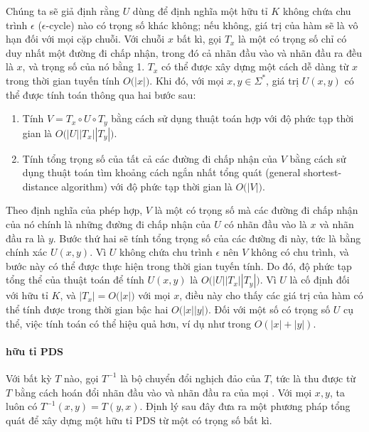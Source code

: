 Chúng ta sẽ giả định rằng  $U$ dùng để định nghĩa một
 hữu tỉ $K$ không chứa chu trình $\epsilon$ ($\epsilon$-cycle) nào
có trọng số khác không; nếu không, giá trị của hàm  sẽ là vô hạn đối
với mọi cặp chuỗi. Với chuỗi $x$ bất kì, gọi $T_x$ là một  có
trọng số chỉ có duy nhất một đường đi chấp nhận, trong đó cả nhãn đầu vào và
nhãn đầu ra đều là $x$, và trọng số của nó bằng 1. $T_x$ có thể được xây dựng
một cách dễ dàng từ $x$ trong thời gian tuyến tính $O\bigl( |x| \bigr)$. Khi
đó, với mọi $x, y \in \Sigma^*$, giá trị $U(x, y)$ có thể được tính toán thông
qua hai bước sau: \begin{enumerate}
  \item Tính $V = T_x \circ U \circ T_y$ bằng cách sử dụng thuật toán hợp với
    độ phức tạp thời gian là $O\bigl(|U||T_x||T_y|\bigr)$.
  \item Tính tổng trọng số của tất cả các đường đi chấp nhận của $V$ bằng cách
    sử dụng thuật toán tìm khoảng cách ngắn nhất tổng quát (general
    shortest-distance algorithm) với độ phức tạp thời gian là $O\bigl( |V|
    \bigr)$.
\end{enumerate}
Theo định nghĩa của phép hợp, $V$ là một  có trọng số mà các
đường đi chấp nhận của nó chính là những đường đi chấp nhận của $U$ có nhãn đầu
vào là $x$ và nhãn đầu ra là $y$. Bước thứ hai sẽ tính tổng trọng số của các
đường đi này, tức là bằng chính xác $U(x, y)$. Vì $U$ không chứa chu trình
$\epsilon$ nên $V$ không có chu trình, và bước này có thể được thực hiện trong
thời gian tuyến tính. Do đó, độ phức tạp tổng thể của thuật toán để tính $U(x,
y)$ là $O\bigl(|U||T_x||T_y|\bigr)$. Vì $U$ là cố định đối với  hữu
tỉ $K$, và $|T_x| = O\bigl(|x|\bigr)$ với mọi $x$, điều này cho thấy các giá
trị của hàm  có thể tính được trong thời gian bậc hai $O\bigl(|x|
|y| \bigr)$. Đối với một số  có trọng số $U$ cụ thể, việc tính
toán có thể hiệu quả hơn, ví dụ như trong $O(|x| + |y|)$.

\paragraph{\protect{} hữu tỉ PDS}

Với bất kỳ  $T$ nào, gọi $T^{-1}$ là bộ chuyển đổi nghịch đảo
của $T$, tức là  thu được từ $T$ bằng cách hoán đổi nhãn đầu vào
và nhãn đầu ra của mọi . Với mọi $x, y$, ta luôn có $T^{-1}(x,
y) = T(y, x)$. Định lý sau đây đưa ra một phương pháp tổng quát để xây dựng một
 hữu tỉ PDS từ một  có trọng số bất kì.

